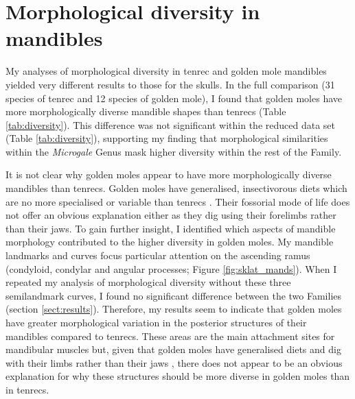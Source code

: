 \section{Morphological diversity in mandibles}
	My analyses of morphological diversity in tenrec and golden mole mandibles yielded very different results to those for the skulls. In the full comparison (31 species of tenrec and 12 species of golden mole), I found that golden moles have more morphologically diverse mandible shapes than tenrecs (Table \ref{tab:diversity}). This difference was not significant within the reduced data set (Table \ref{tab:diversity}), supporting my finding that morphological similarities within the \textit{Microgale} Genus mask higher diversity within the rest of the Family.
	
	It is not clear why golden moles appear to have more morphologically diverse mandibles than tenrecs. Golden moles have generalised, insectivorous diets \citep{Bronner1995} which are no more specialised or variable than tenrecs \citep{Soarimalala2011}. Their fossorial mode of life does not offer an obvious explanation either as they dig using their forelimbs rather than their jaws.
	To gain further insight, I identified which aspects of mandible morphology contributed to the higher diversity in golden moles. My mandible landmarks and curves focus particular attention on the ascending ramus (condyloid, condylar and angular processes; Figure \ref{fig:sklat_mands}). When I repeated my analysis of morphological diversity without these three semilandmark curves, I found no significant difference between the two Families (section \ref{sect:results}). Therefore, my results seem to indicate that golden moles have greater morphological variation in the posterior structures of their mandibles compared to tenrecs. These areas are the main attachment sites for mandibular muscles but, given that golden moles have generalised diets and dig with their limbs rather than their jaws \citep{Bronner1995}, there does not appear to be an obvious explanation for why these structures should be more diverse in golden moles than in tenrecs.
	
